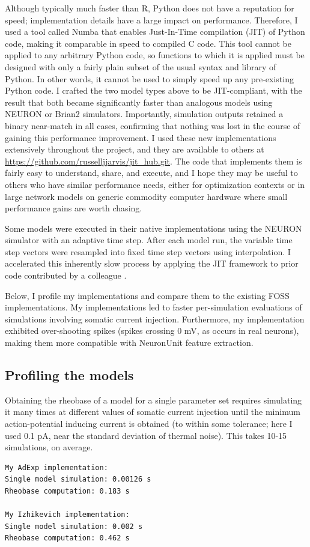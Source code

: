 Although typically much faster than R, Python does not have a reputation for speed; implementation details have a large impact on performance.
Therefore, I used a tool called Numba \citep{lam2015numba} that enables Just-In-Time compilation (JIT) of Python code, making it comparable in speed to compiled C code.
This tool cannot be applied to any arbitrary Python code, so functions to which it is applied must be designed with only a fairly plain subset of the usual syntax and library of Python.
In other words, it cannot be used to simply speed up any pre-existing Python code.
I crafted the two model types above to be JIT-compliant, with the result that both became significantly faster than analogous models using NEURON or Brian2 simulators.
Importantly, simulation outputs retained a binary near-match in all cases, confirming that nothing was lost in the course of gaining this performance improvement.
I used these new implementations extensively throughout the project, and they are available to others at \url{https://github.com/russelljjarvis/jit_hub.git}. 
The code that implements them is fairly easy to understand, share, and execute, and I hope they may be useful to others who have similar performance needs, either for optimization contexts or in large network models on generic commodity computer hardware where small performance gains are worth chasing. 

Some models were executed in their native implementations using the NEURON simulator with an adaptive time step.
After each model run, the variable time step vectors were resampled into fixed time step vectors using interpolation.
I accelerated this inherently slow process by applying the JIT framework to prior code contributed by a colleague \citep{birgiolas2019towards}.

Below, I profile my implementations and compare them to the existing FOSS implementations.
My implementations led to faster per-simulation evaluations of simulations involving somatic current injection. 
Furthermore, my implementation exhibited over-shooting spikes (spikes crossing 0 mV, as occurs in real neurons), making them more compatible with NeuronUnit feature extraction.

\subsection{Profiling the models}
Obtaining the rheobase of a model for a single parameter set requires simulating it many times at different values of somatic current injection until the minimum action-potential inducing current is obtained (to within some tolerance; here I used 0.1 pA, near the standard deviation of thermal noise).
This takes 10-15 simulations, on average.
\begin{verbatim}
My AdExp implementation:
Single model simulation: 0.00126 s
Rheobase computation: 0.183 s

My Izhikevich implementation:
Single model simulation: 0.002 s
Rheobase computation: 0.462 s
\end{verbatim}

